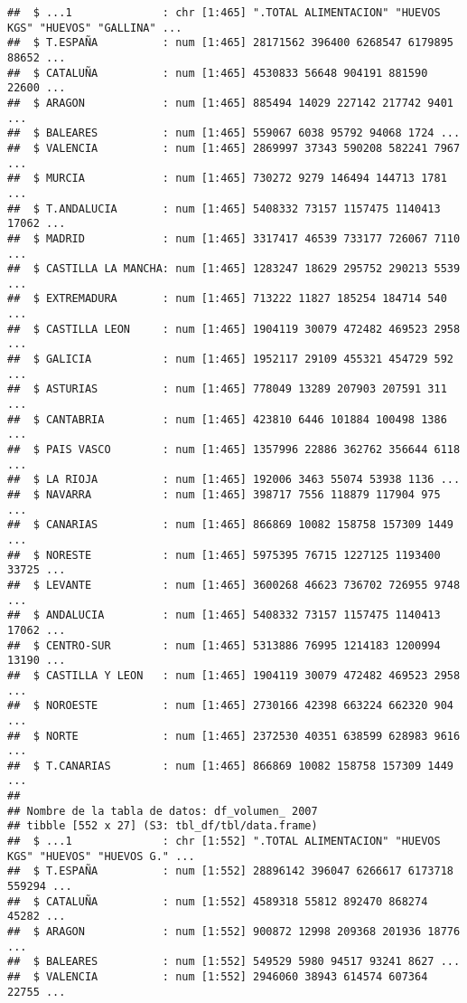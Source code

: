 \documentclass[
]{article}
\begin{document}
\begin{verbatim}
##  $ ...1              : chr [1:465] ".TOTAL ALIMENTACION" "HUEVOS KGS" "HUEVOS" "GALLINA" ...
##  $ T.ESPAÑA          : num [1:465] 28171562 396400 6268547 6179895 88652 ...
##  $ CATALUÑA          : num [1:465] 4530833 56648 904191 881590 22600 ...
##  $ ARAGON            : num [1:465] 885494 14029 227142 217742 9401 ...
##  $ BALEARES          : num [1:465] 559067 6038 95792 94068 1724 ...
##  $ VALENCIA          : num [1:465] 2869997 37343 590208 582241 7967 ...
##  $ MURCIA            : num [1:465] 730272 9279 146494 144713 1781 ...
##  $ T.ANDALUCIA       : num [1:465] 5408332 73157 1157475 1140413 17062 ...
##  $ MADRID            : num [1:465] 3317417 46539 733177 726067 7110 ...
##  $ CASTILLA LA MANCHA: num [1:465] 1283247 18629 295752 290213 5539 ...
##  $ EXTREMADURA       : num [1:465] 713222 11827 185254 184714 540 ...
##  $ CASTILLA LEON     : num [1:465] 1904119 30079 472482 469523 2958 ...
##  $ GALICIA           : num [1:465] 1952117 29109 455321 454729 592 ...
##  $ ASTURIAS          : num [1:465] 778049 13289 207903 207591 311 ...
##  $ CANTABRIA         : num [1:465] 423810 6446 101884 100498 1386 ...
##  $ PAIS VASCO        : num [1:465] 1357996 22886 362762 356644 6118 ...
##  $ LA RIOJA          : num [1:465] 192006 3463 55074 53938 1136 ...
##  $ NAVARRA           : num [1:465] 398717 7556 118879 117904 975 ...
##  $ CANARIAS          : num [1:465] 866869 10082 158758 157309 1449 ...
##  $ NORESTE           : num [1:465] 5975395 76715 1227125 1193400 33725 ...
##  $ LEVANTE           : num [1:465] 3600268 46623 736702 726955 9748 ...
##  $ ANDALUCIA         : num [1:465] 5408332 73157 1157475 1140413 17062 ...
##  $ CENTRO-SUR        : num [1:465] 5313886 76995 1214183 1200994 13190 ...
##  $ CASTILLA Y LEON   : num [1:465] 1904119 30079 472482 469523 2958 ...
##  $ NOROESTE          : num [1:465] 2730166 42398 663224 662320 904 ...
##  $ NORTE             : num [1:465] 2372530 40351 638599 628983 9616 ...
##  $ T.CANARIAS        : num [1:465] 866869 10082 158758 157309 1449 ...
##  
## Nombre de la tabla de datos: df_volumen_ 2007 
## tibble [552 x 27] (S3: tbl_df/tbl/data.frame)
##  $ ...1              : chr [1:552] ".TOTAL ALIMENTACION" "HUEVOS KGS" "HUEVOS" "HUEVOS G." ...
##  $ T.ESPAÑA          : num [1:552] 28896142 396047 6266617 6173718 559294 ...
##  $ CATALUÑA          : num [1:552] 4589318 55812 892470 868274 45282 ...
##  $ ARAGON            : num [1:552] 900872 12998 209368 201936 18776 ...
##  $ BALEARES          : num [1:552] 549529 5980 94517 93241 8627 ...
##  $ VALENCIA          : num [1:552] 2946060 38943 614574 607364 22755 ...

\end{verbatim}
\end{document}
